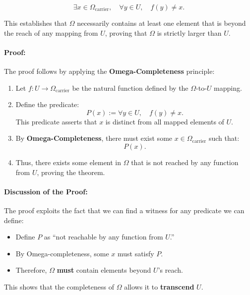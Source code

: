 \documentclass[12pt]{article}
\begin{document}
\begin{equation}
    \exists x \in \Omega_{\text{carrier}}, \quad
    \forall y \in U, \quad f(y) \neq x.
\end{equation}

This establishes that \( \Omega \) necessarily contains at least one element that is beyond the reach of any mapping from \( U \), proving that \( \Omega \) is strictly larger than \( U \).

\paragraph{Proof:}
The proof follows by applying the \textbf{Omega-Completeness} principle:

\begin{enumerate}
    \item Let \( f: U \to \Omega_{\text{carrier}} \) be the natural function defined by the \( \Omega \)-to-\( U \) mapping.
    \item Define the predicate:
    \[
    P(x) := \forall y \in U, \quad f(y) \neq x.
    \]
    This predicate asserts that \( x \) is distinct from all mapped elements of \( U \).
    \item By \textbf{Omega-Completeness}, there must exist some \( x \in \Omega_{\text{carrier}} \) such that:
    \[
    P(x).
    \]
    \item Thus, there exists some element in \( \Omega \) that is not reached by any function from \( U \), proving the theorem.
\end{enumerate}

\paragraph{Discussion of the Proof:}
The proof exploits the fact that we can find a witness for any predicate we can define:
\begin{itemize}
    \item Define \( P \) as “not reachable by any function from \( U \).”
    \item By Omega-completeness, some \( x \) must satisfy \( P \).
    \item Therefore, \( \Omega \) \textbf{must} contain elements beyond \( U \)’s reach.
\end{itemize}

This shows that the completeness of \( \Omega \) allows it to \textbf{transcend} \( U \).
\end{document}
